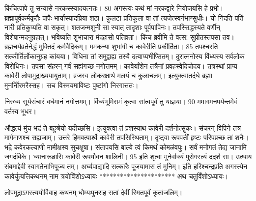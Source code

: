 किंचित्पापे तु सन्यासे नरकस्स्यादयत्नतः।
 80
अगस्त्यः
कथं मां नरकद्वारे नियोजयसि हे प्रभो।
 ब्रह्मापूर्वकर्मकृतैः पापैः भार्यास्यादप्रिया शठा।
 कुलटा प्रतिकूला वा तां त्यजेत्स्वर्गभाग्सुधीः।
 यो निंदति पतिं नारी प्रतिकुप्यति वा सकृत्।
 शतजन्मशुनी सा स्यात् तादृशाः पूर्वपापिनः।
 तपस्सिद्धस्यते वर्णीन् विशेषान्मदनुग्रहात्।
 भविष्यति शुभाचारा मंदहासो पतिव्रता।
 किंच ब्रवीमि ते वत्स! सुप्रीतस्तपसा तव।
 ब्रह्मचर्यव्रतेनेद्धं मुक्तिदं कर्मवैदिकम्।
 ममकन्या शुभांगी च कावेरीति प्रकीर्तिता।
 85 तपश्चरति सत्कीर्तिर्लोकानुग्रह कांयया।
 विधिना तां समुद्वाह्य तस्यै दत्वाप्यभीप्सितम्।
 दुरात्मनोस्य विंध्यस्य सर्वलोक विरोधिनः।
 तपसा संहरन् गर्वं सह्यंगच्छ नगोत्तमम्।
 कावेर्यांशेन तत्रैनां प्रवहस्वेदिचोदय।
 तत्रस्थां प्राप्य कावेरी लोपामुद्राख्ययायुताम्।
 व्रजस्व लोकरक्षार्थ मलयं च कुलाचलम्।
 इत्युक्त्वांतर्दधे ब्रह्मा मुनर्नोिरमरैस्सह।
 सच विस्मयमाविष्टः पुष्टांगो निरगात्ततः।
 
निरुध्य सूर्यसंचारं वर्धमानं नगोत्तमम्।
 विंध्यंभूमिसमं कृत्वा सांत्वपूर्वं तु याज्ञया।
 90 ममागमनपर्यन्तमेवं वर्तस्व भूधर।

औद्धत्यं मुंच भद्रं ते बहुश्रेयो यदीच्छसि।
 इत्युक्त्वा तं प्रशस्याथ कावेरी दर्शनोत्सुकः।
 संचरन् विपिने तत्र मार्गमाणश्च सह्यजाम्।
 उत्तरे हिमवत्पार्श्वे कावेरी तपसिस्थिताम्।
 दृष्ट्वा रूपवतीं हृष्टः परिपप्रच्छ तां शनैः।
 भद्रे कवेरकल्याणी मामीक्षस्व सुचक्षुषा।
 संतापयसि बाल्ये त्वं किमर्थं कोमळंवपुः।
 सर्वं मनोगतं तेद्य जानामि जगदंबिके।
 ध्यानारूढासि कावेरी रूपयौवन शालिनी।
 95 इति शृत्वा मुनेर्वाक्यं पुरोगस्त्यं ददर्श सा।
 उत्थाय संबमाद्देवी स्वागतेनाभिपूज्य तम्।
 अर्घ्यपाद्यादि सत्कारैः पूजयामास तं मुनिम्।
 इति हरिश्चन्द्रप्रति अगस्त्येन कावेर्युत्पत्तिकथनम्
नाम त्रयोविंशोऽध्यायः
**********************
अथ चतुर्विंशोऽध्यायः।

लोपमुद्राऽगस्त्ययोर्विवाह कथनम् धौम्यःपुनराह सतां देवीं स्मितपूर्वं कृतांजलिम्।

